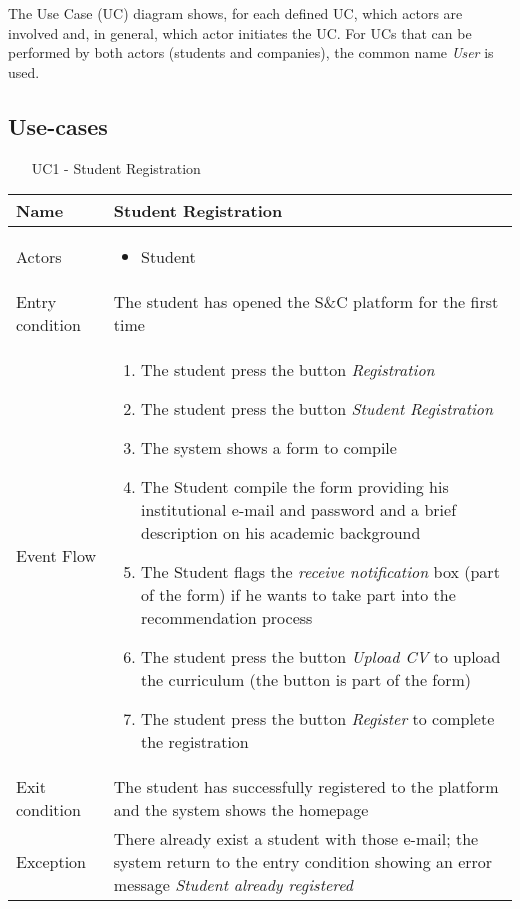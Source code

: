 			The Use Case (UC) diagram shows, for each defined UC, which actors are involved and, in general, which actor initiates the UC. For UCs that can be performed by both actors (students and companies), the common name \textit{User} is used.	
			
		\subsection{Use-cases}
			
			\begin{table} [H]
				\centering
				\begin{itemize}
					\item [UC1] - Student Registration
				\end{itemize}
				\begin{tabular}{|| P{7.5cm} | P{7.5cm} ||}
					\hline
					Name & Student Registration \\
					\hline
					Actors & \parbox{5cm}{\begin{itemize}
							\item Student
							\end{itemize}
						} \\
					\hline
					Entry condition & The student has opened the S\&C platform for the first time \\
					\hline
					Event Flow & \parbox{5cm}{\begin{enumerate}
						\item The student press the button \textit{Registration}
						\item The student press the button \textit{Student Registration}
						\item The system shows a form to compile
						\item The Student compile the form providing his institutional e-mail and password and a brief description on his academic 
						background
						\item The Student flags the \textit{receive 
						notification} box (part of the form) 
						if he wants to take part into the recommendation process 
						\item The student press the button 
						\textit{Upload CV} to upload the 
						curriculum (the button is part of 
						the form)
						\item The student press the button 
						\textit{Register} to complete the 
						registration
						\end{enumerate}} \\
					\hline 
					Exit condition & The student has successfully registered 
					to the platform and the system shows the 
					homepage \\
					\hline
					Exception & There already exist a student with those e-mail; the system return to the entry condition showing an error message \textit{Student already registered} \\
					\hline
				\end{tabular}
			\end{table}
			
